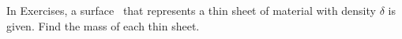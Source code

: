 \begin{exerciseset}{In Exercises}{, a surface \surfaceS\ that represents a thin sheet of material with density $\delta$ is given. Find the mass of each thin sheet.}



\end{exerciseset}
